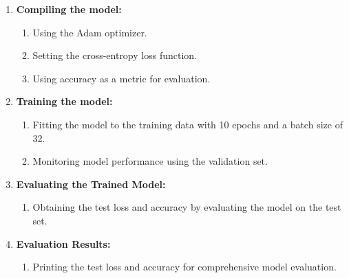 \begin{enumerate}
    \item \textbf{Compiling the model:}
          \begin{enumerate}
             \item Using the Adam optimizer.
             \item Setting the cross-entropy loss function.
             \item Using accuracy as a metric for evaluation.
          \end{enumerate}
 
    \item \textbf{Training the model:}
          \begin{enumerate}
             \item Fitting the model to the training data with 10 epochs and a batch size of 32.
             \item Monitoring model performance using the validation set.
          \end{enumerate}
 
    \item \textbf{Evaluating the Trained Model:}
          \begin{enumerate}
             \item Obtaining the test loss and accuracy by evaluating the model on the test set.
          \end{enumerate}
 
    \item \textbf{Evaluation Results:}
          \begin{enumerate}
             \item Printing the test loss and accuracy for comprehensive model evaluation.
          \end{enumerate}
 \end{enumerate}
 



